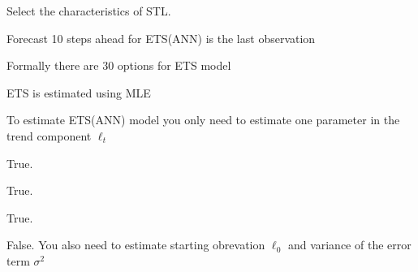 
\begin{question}
Select the characteristics of STL.
\begin{answerlist}
  \item Forecast 10 steps ahead for ETS(ANN) is the last observation
  \item Formally there are 30 options for ETS model
  \item ETS is estimated using MLE
  \item To estimate ETS(ANN) model you only need to estimate one parameter in the trend component \(\ell_t\)
\end{answerlist}
\end{question}

\begin{solution}
\begin{answerlist}
  \item True.
  \item True.
  \item True.
  \item False. You also need to estimate starting obrevation \(\ell_0\) and variance of the error term \(\sigma^2\)
\end{answerlist}
\end{solution}

